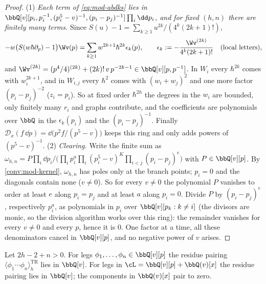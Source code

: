\begin{proof}
(1) \emph{Each term of \eqref{eq:mod-abdks} lies in $\bbQ[v][p_i,p_i^{-1},(p_i^5-v)^{-1},(p_i-p_j)^{-1}]\prod_i\dd p_i$, and for fixed $(h,n)$ there are finitely many terms.} Since $S(u)-1=\sum_{k\geq 1}u^{2k}/(4^k(2k+1)!)$,
\[
-w\big(S(w\hbar\partial_p)-1\big)\Wv(p)=\sum_{k\geq 1}w^{2k+1}\hbar^{2k}\epsilon_k(p),\qquad \epsilon_k:=-\frac{\Wv^{(2k)}}{4^k(2k+1)!}\quad(\text{local letters}),
\]
and $\Wv^{(2k)}=(p^4/4)^{(2k)}+(2k)!\,v\,p^{-2k-1}\in\bbQ[v][p,p^{-1}]$. In $W_i$ every $\hbar^{2k}$ comes with $w_i^{2k+1}$, and in $W_{i,j}$ every $\hbar^2$ comes with $(w_i+w_j)^2$ and one more factor $(p_i-p_j)^{-2}$ ($z_i=p_i$). So at fixed order $\hbar^{2h}$ the degrees in the $w_i$ are bounded, only finitely many $r_i$ and graphs contribute, and the coefficients are polynomials over $\bbQ$ in the $\epsilon_k(p_i)$ and the $(p_i-p_j)^{-1}$. Finally $\mathcal D_x(f\,\dd p)=\dd\big(p^2f/(p^5-v)\big)$ keeps this ring and only adds powers of $(p^5-v)^{-1}$. (2) \emph{Clearing.} Write the finite sum as $\omega_{h,n}=P\prod_i\dd p_i\big/\big(\prod_ip_i^{a}\prod_i(p_i^5-v)^{K}\prod_{i<j}(p_i-p_j)^{e}\big)$ with $P\in\bbQ[v][p]$. By \cref{conv:mod-kernel}, $\omega_{h,n}$ has poles only at the branch points; $p_i=0$ and the diagonals contain none ($v\neq 0$). So for every $v\neq 0$ the polynomial $P$ vanishes to order at least $e$ along $p_i=p_j$ and at least $a$ along $p_i=0$. Divide $P$ by $(p_i-p_j)^e$, respectively $p_i^a$, as polynomials in $p_i$ over $\bbQ[v][p_k:k\neq i]$ (the divisors are monic, so the division algorithm works over this ring): the remainder vanishes for every $v\neq 0$ and every $p$, hence it is $0$. One factor at a time, all these denominators cancel in $\bbQ[v][p]$, and no negative power of $v$ arises.
\end{proof}

\begin{thm}[L-regularity]
\label{thm:mod-Lreg}
Let $2h-2+n>0$. For legs $\phi_1,\dots,\phi_n\in\bbQ[v][p]$ the residue pairing $\langle\phi_1\cdots\phi_n\rangle^{\mathrm{TR}}_h$ lies in $\bbQ[v]$. For legs in $\cL=\bbQ[v][p]+\bbQ(v)[x]$ the residue pairing lies in $\bbQ[v]$; the components in $\bbQ(v)[x]$ pair to zero.
\end{thm}


